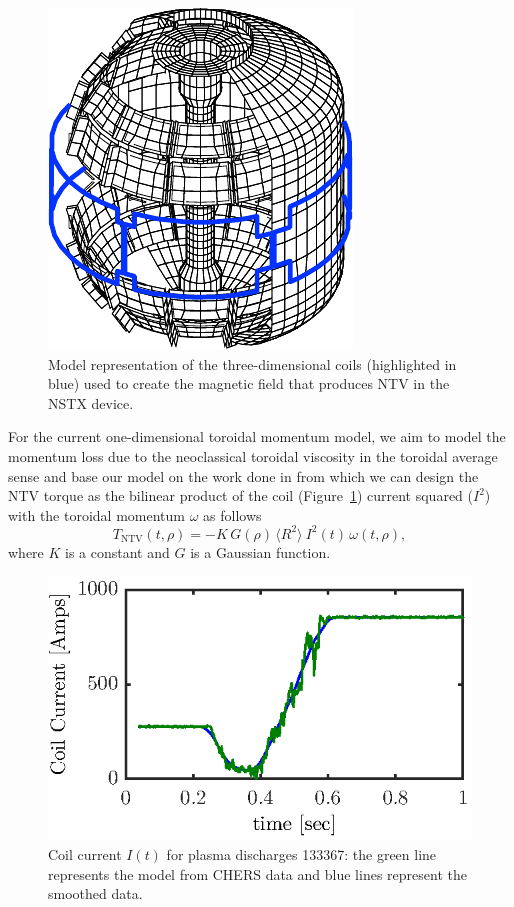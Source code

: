 \documentclass{iopart}
\begin{document}
\begin{figure}
	\centering
   \includegraphics{fig5}
\caption{Model representation of the three-dimensional coils (highlighted in
  blue) used to create the magnetic field that produces NTV in the NSTX device.}
  \label{pic_NTV}
\end{figure}
For the current one-dimensional toroidal momentum model, we aim to model the momentum loss due to the neoclassical toroidal viscosity in the toroidal average sense and base our model on the work done in \cite{Zhu06} from which we can design the NTV torque as the bilinear product of the coil (Figure~\ref{pic_NTV}) current squared ($ I^2$) with the toroidal momentum $\omega$ as follows
\begin{equation}
   T_\text{NTV}  (t, \rho) =  - K \, G(\rho) \,  \langle R^2 \rangle \:  I^2(t) \,\omega (t, \rho),
    \label{eqn:ntv}
\end{equation}
where $K$ is a constant and $G$ is a Gaussian function.
\begin{figure}
	\centering
	\includegraphics{fig6}  %
	\caption{ Coil current $I(t)$ for plasma discharges 133367:
          the green line represents the model from CHERS data and  blue lines represent the smoothed data.}
	\label{fig:current}
\end{figure}
\end{document}
